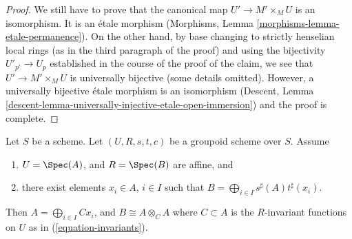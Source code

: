 \begin{proof}
\medskip\noindent
We still have to prove that the canonical map $U' \to M' \times_M U$
is an isomorphism. It is an \'etale morphism
(Morphisms, Lemma \ref{morphisms-lemma-etale-permanence}).
On the other hand, by base changing to strictly henselian local rings
(as in the third paragraph of the proof) and using the bijectivity
$U'_{p'} \to U_p$ established in the course of the proof of the claim,
we see that $U' \to M' \times_M U$ is universally bijective
(some details omitted). However, a universally bijective
\'etale morphism is an isomorphism
(Descent, Lemma \ref{descent-lemma-universally-injective-etale-open-immersion})
and the proof is complete.
\end{proof}

\begin{lemma}
\label{lemma-basis}
Let $S$ be a scheme.
Let $(U, R, s, t, c)$ be a groupoid scheme over $S$.
Assume
\begin{enumerate}
\item $U = \Spec(A)$, and $R = \Spec(B)$ are affine, and
\item there exist elements $x_i \in A$, $i \in I$ such that
$B = \bigoplus_{i \in I} s^\sharp(A)t^\sharp(x_i)$.
\end{enumerate}
Then $A = \bigoplus_{i\in I} Cx_i$, and $B \cong A \otimes_C A$
where $C \subset A$ is the $R$-invariant
functions on $U$ as in (\ref{equation-invariants}).
\end{lemma}

